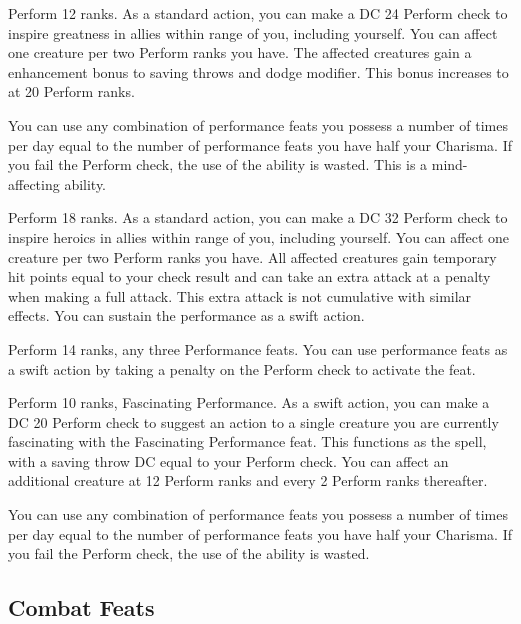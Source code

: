 \featpre Perform 12 ranks.
\featben As a standard action, you can make a DC 24 Perform check to inspire greatness in allies within \rngmed range of you, including yourself. You can affect one creature per two Perform ranks you have. The affected creatures gain a  enhancement bonus to saving throws and dodge modifier. This bonus increases to  at 20 Perform ranks.

You can use any combination of performance feats you possess a number of times per day equal to the number of performance feats you have \add half your Charisma. If you fail the Perform check, the use of the ability is wasted. This is a mind-affecting ability.

\featpre Perform 18 ranks.
\featben As a standard action, you can make a DC 32 Perform check to inspire heroics in allies within \rngmed range of you, including yourself. You can affect one creature per two Perform ranks you have. All affected creatures gain temporary hit points equal to your check result and can take an extra attack at a  penalty when making a full attack. This extra attack is not cumulative with similar effects. You can sustain the performance as a swift action.

\featpre Perform 14 ranks, any three Performance feats.
\featben You can use performance feats as a swift action by taking a  penalty on the Perform check to activate the feat.

\featpre Perform 10 ranks, Fascinating Performance.
\featben As a swift action, you can make a DC 20 Perform check to suggest an action to a single creature you are currently fascinating with the Fascinating Performance feat. This functions as the  spell, with a saving throw DC equal to your Perform check. You can affect an additional creature at 12 Perform ranks and every 2 Perform ranks thereafter.

You can use any combination of performance feats you possess a number of times per day equal to the number of performance feats you have \add half your Charisma. If you fail the Perform check, the use of the ability is wasted.

\subsection{Combat Feats}

